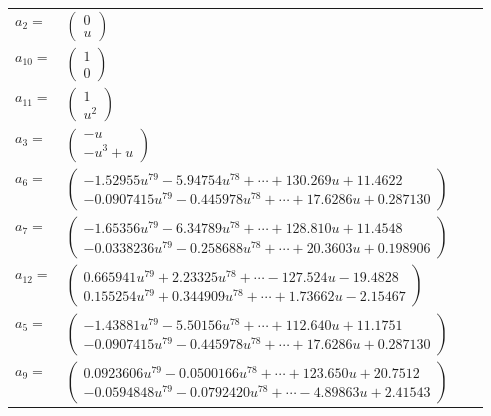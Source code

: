 \documentclass[1p]{elsarticle_modified}
\theoremstyle{definition}
\begin{document}
\begin{tabular}{m{7pt} m{180pt} m{7pt} m{180pt} }
\flushright $a_{2}=$&$\begin{pmatrix}0\\u\end{pmatrix}$ \\
\flushright $a_{10}=$&$\begin{pmatrix}1\\0\end{pmatrix}$ \\
\flushright $a_{11}=$&$\begin{pmatrix}1\\u^2\end{pmatrix}$ \\
\flushright $a_{3}=$&$\begin{pmatrix}- u\\- u^3+u\end{pmatrix}$ \\
\flushright $a_{6}=$&$\begin{pmatrix}-1.52955 u^{79}-5.94754 u^{78}+\cdots+130.269 u+11.4622\\-0.0907415 u^{79}-0.445978 u^{78}+\cdots+17.6286 u+0.287130\end{pmatrix}$ \\
\flushright $a_{7}=$&$\begin{pmatrix}-1.65356 u^{79}-6.34789 u^{78}+\cdots+128.810 u+11.4548\\-0.0338236 u^{79}-0.258688 u^{78}+\cdots+20.3603 u+0.198906\end{pmatrix}$ \\
\flushright $a_{12}=$&$\begin{pmatrix}0.665941 u^{79}+2.23325 u^{78}+\cdots-127.524 u-19.4828\\0.155254 u^{79}+0.344909 u^{78}+\cdots+1.73662 u-2.15467\end{pmatrix}$ \\
\flushright $a_{5}=$&$\begin{pmatrix}-1.43881 u^{79}-5.50156 u^{78}+\cdots+112.640 u+11.1751\\-0.0907415 u^{79}-0.445978 u^{78}+\cdots+17.6286 u+0.287130\end{pmatrix}$ \\
\flushright $a_{9}=$&$\begin{pmatrix}0.0923606 u^{79}-0.0500166 u^{78}+\cdots+123.650 u+20.7512\\-0.0594848 u^{79}-0.0792420 u^{78}+\cdots-4.89863 u+2.41543\end{pmatrix}$ \\

\end{tabular}
\end{document}
